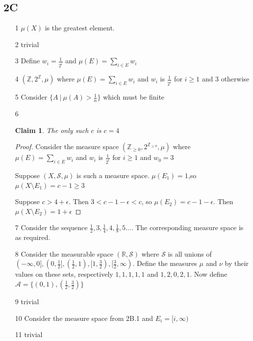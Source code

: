 \documentclass{article}
\newtheorem*{claim}{Claim}
\begin{document}
\subsection*{2C}
\begin{itemize}
    \item [1] $\mu(X)$ is the greatest element.
    \item [2] trivial
    \item [3] Define $w_i=\frac{1}{2^i}$ and $\mu(E)=\sum_{i \in E} w_i$
    \item [4] $(\mathbb{Z},2^\mathbb{Z},\mu)$ where $\mu(E)=\sum_{i \in E} w_i$ and $w_i$ is $\frac{1}{2^i}$ for $i \geq 1$ and $3$ otherwise
    \item [5] Consider $\{ A \ | \ \mu(A) > \frac{1}{n}\}$ which must be finite
    \item [6] \begin{claim}
        The only such $c$ is $c=4$
    \end{claim}
    \begin{proof}
        Consider the measure space $(\mathbb{Z}_{\geq0},2^{\mathbb{Z}_{\geq0}},\mu)$ where $\mu(E)=\sum_{i \in E} w_i$ and $w_i$ is $\frac{1}{2^i}$ for $i \geq 1$ and $w_0=3$

        Suppose $(X,\mathcal{S},\mu)$ is such a measure space. 
        $\mu(E_1)=1$,so $\mu(X\setminus E_1)=c-1\geq3$

        Suppose $c > 4+\epsilon$. Then $3<c-1-\epsilon<c$, so $\mu(E_2)=c-1-\epsilon$. Then $\mu(X\setminus E_2)=1+\epsilon$
        
    \end{proof}
    \item [7] Consider the sequence $\frac{1}{2},3,\frac{1}{4},4,\frac{1}{8},5...$. The corresponding measure space is as required.

    \item[8] Consider the measurable space $(\mathbb{R},\mathcal{S})$ where $\mathcal{S}$ is all unions of $(-\infty,0],(0,\frac{1}{2}],(\frac{1}{2},1),[1,\frac{3}{2}),[\frac{3}{2},\infty)$. Define the measures $\mu$ and $\nu$ by their values on these sets, respectively $1,1,1,1,1$ and $1,2,0,2,1$. Now define $\mathcal{A}=\{(0,1),(\frac{1}{2},\frac{3}{2})\}$

    \item[9] trivial
    \item[10] Consider the measure space from 2B.1 and $E_i=[i,\infty)$
    \item [11] trivial
    
\end{itemize}
\end{document}
